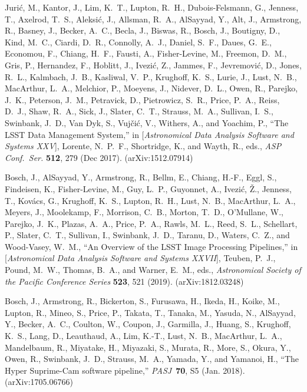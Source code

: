 \documentclass[]{spie}
\newcommand{\pasj}{PASJ}
\begin{document}
\begin{thebibliography}{10}
  {Juri{\'c}}, M., {Kantor}, J., {Lim}, K.~T., {Lupton}, R.~H.,
    {Dubois-Felsmann}, G., {Jenness}, T., {Axelrod}, T.~S., {Aleksi{\'c}}, J.,
    {Allsman}, R.~A., {AlSayyad}, Y., {Alt}, J., {Armstrong}, R., {Basney}, J.,
    {Becker}, A.~C., {Becla}, J., {Biswas}, R., {Bosch}, J., {Boutigny}, D.,
    {Kind}, M.~C., {Ciardi}, D.~R., {Connolly}, A.~J., {Daniel}, S.~F., {Daues},
    G.~E., {Economou}, F., {Chiang}, H.~F., {Fausti}, A., {Fisher-Levine}, M.,
    {Freemon}, D.~M., {Gris}, P., {Hernandez}, F., {Hoblitt}, J., {Ivezi{\'c}},
    Z., {Jammes}, F., {Jevremovi{\'c}}, D., {Jones}, R.~L., {Kalmbach}, J.~B.,
    {Kasliwal}, V.~P., {Krughoff}, K.~S., {Lurie}, J., {Lust}, N.~B.,
    {MacArthur}, L.~A., {Melchior}, P., {Moeyens}, J., {Nidever}, D.~L., {Owen},
    R., {Parejko}, J.~K., {Peterson}, J.~M., {Petravick}, D., {Pietrowicz},
    S.~R., {Price}, P.~A., {Reiss}, D.~J., {Shaw}, R.~A., {Sick}, J., {Slater},
    C.~T., {Strauss}, M.~A., {Sullivan}, I.~S., {Swinbank}, J.~D., {Van Dyk}, S.,
    {Vuj{\v{c}}i{\'c}}, V., {Withers}, A., and {Yoachim}, P., ``{The LSST Data
    Management System},'' in [{\em Astronomical Data Analysis Software and
    Systems XXV}{\nolinebreak\hspace{0.1em}]},  {Lorente}, N.~P.~F.,
    {Shortridge}, K., and {Wayth}, R., eds., {\em ASP Conf.\ Ser.} {\bf 512},
    279 (Dec 2017).
    (arXiv:1512.07914)

  {Bosch}, J., {AlSayyad}, Y., {Armstrong}, R., {Bellm}, E., {Chiang}, H.-F.,
    {Eggl}, S., {Findeisen}, K., {Fisher-Levine}, M., {Guy}, L.~P., {Guyonnet},
    A., {Ivezi{\'c}}, {\v{Z}}., {Jenness}, T., {Kov{\'a}cs}, G., {Krughoff},
    K.~S., {Lupton}, R.~H., {Lust}, N.~B., {MacArthur}, L.~A., {Meyers}, J.,
    {Moolekamp}, F., {Morrison}, C.~B., {Morton}, T.~D., {O'Mullane}, W.,
    {Parejko}, J.~K., {Plazas}, A.~A., {Price}, P.~A., {Rawls}, M.~L., {Reed},
    S.~L., {Schellart}, P., {Slater}, C.~T., {Sullivan}, I., {Swinbank}, J.~D.,
    {Taranu}, D., {Waters}, C.~Z., and {Wood-Vasey}, W.~M., ``{An Overview of the
    LSST Image Processing Pipelines},'' in [{\em Astronomical Data Analysis
    Software and Systems XXVII}{\nolinebreak\hspace{0.1em}]},  {Teuben}, P.~J.,
    {Pound}, M.~W., {Thomas}, B.~A., and {Warner}, E.~M., eds., {\em Astronomical
    Society of the Pacific Conference Series} {\bf 523},  521 (2019).
    (arXiv:1812.03248)

  {Bosch}, J., {Armstrong}, R., {Bickerton}, S., {Furusawa}, H., {Ikeda}, H.,
    {Koike}, M., {Lupton}, R., {Mineo}, S., {Price}, P., {Takata}, T., {Tanaka},
    M., {Yasuda}, N., {AlSayyad}, Y., {Becker}, A.~C., {Coulton}, W., {Coupon},
    J., {Garmilla}, J., {Huang}, S., {Krughoff}, K.~S., {Lang}, D., {Leauthaud},
    A., {Lim}, K.-T., {Lust}, N.~B., {MacArthur}, L.~A., {Mandelbaum}, R.,
    {Miyatake}, H., {Miyazaki}, S., {Murata}, R., {More}, S., {Okura}, Y.,
    {Owen}, R., {Swinbank}, J.~D., {Strauss}, M.~A., {Yamada}, Y., and {Yamanoi},
    H., ``{The Hyper Suprime-Cam software pipeline},'' {\em \pasj}~{\bf 70},  S5
    (Jan. 2018).
    (arXiv:1705.06766)


\end{thebibliography}
\end{document}
